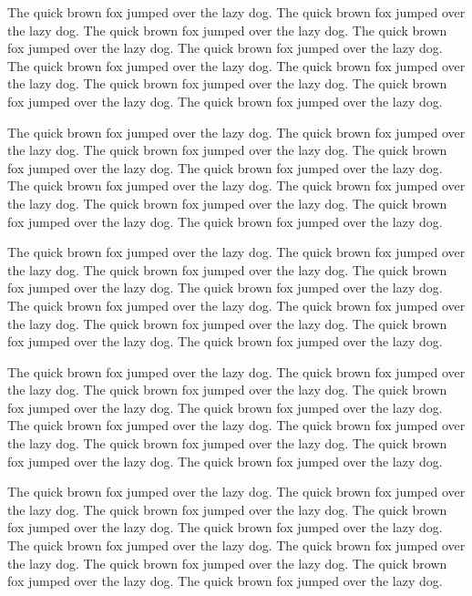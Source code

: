\documentclass[
  12pt]{article}
\begin{document}
The quick brown fox jumped over the lazy dog. The quick brown fox jumped
over the lazy dog. The quick brown fox jumped over the lazy dog. The
quick brown fox jumped over the lazy dog. The quick brown fox jumped
over the lazy dog. The quick brown fox jumped over the lazy dog. The
quick brown fox jumped over the lazy dog. The quick brown fox jumped
over the lazy dog. The quick brown fox jumped over the lazy dog. The
quick brown fox jumped over the lazy dog.

\addtolength{\textheight}{-.5in}%

\addtolength{\textheight}{.2in}%

The quick brown fox jumped over the lazy dog. The quick brown fox jumped
over the lazy dog. The quick brown fox jumped over the lazy dog. The
quick brown fox jumped over the lazy dog. The quick brown fox jumped
over the lazy dog. The quick brown fox jumped over the lazy dog. The
quick brown fox jumped over the lazy dog. The quick brown fox jumped
over the lazy dog. The quick brown fox jumped over the lazy dog. The
quick brown fox jumped over the lazy dog.

The quick brown fox jumped over the lazy dog. The quick brown fox jumped
over the lazy dog. The quick brown fox jumped over the lazy dog. The
quick brown fox jumped over the lazy dog. The quick brown fox jumped
over the lazy dog. The quick brown fox jumped over the lazy dog. The
quick brown fox jumped over the lazy dog. The quick brown fox jumped
over the lazy dog. The quick brown fox jumped over the lazy dog. The
quick brown fox jumped over the lazy dog.

The quick brown fox jumped over the lazy dog. The quick brown fox jumped
over the lazy dog. The quick brown fox jumped over the lazy dog. The
quick brown fox jumped over the lazy dog. The quick brown fox jumped
over the lazy dog. The quick brown fox jumped over the lazy dog. The
quick brown fox jumped over the lazy dog. The quick brown fox jumped
over the lazy dog. The quick brown fox jumped over the lazy dog. The
quick brown fox jumped over the lazy dog.

The quick brown fox jumped over the lazy dog. The quick brown fox jumped
over the lazy dog. The quick brown fox jumped over the lazy dog. The
quick brown fox jumped over the lazy dog. The quick brown fox jumped
over the lazy dog. The quick brown fox jumped over the lazy dog. The
quick brown fox jumped over the lazy dog. The quick brown fox jumped
over the lazy dog. The quick brown fox jumped over the lazy dog. The
quick brown fox jumped over the lazy dog.
\end{document}
